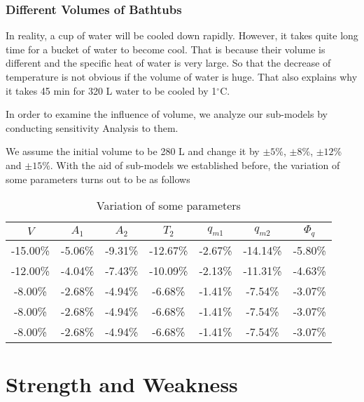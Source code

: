 \documentclass{mcmthesis}
\begin{document}
\subsubsection{Different Volumes of Bathtubs}

In reality, a cup of water will be cooled down rapidly. However, it takes quite
long time for a bucket of water to become cool. That is because their volume is
different and the specific heat of water is very large. So that the decrease of
temperature is not obvious if the volume of water is huge. That also explains
why it takes 45 min for 320 L water to be cooled by 1$^\circ$C.

In order to examine the influence of volume, we analyze our sub-models
by conducting sensitivity Analysis to them.

We assume the initial volume to be 280 L and change it by $\pm 5$\%, $\pm 8$\%,
$\pm 12$\% and $\pm 15$\%. With the aid of sub-models we established before, the
variation of some parameters turns out to be as follows

\begin{table}[h] %
    \centering  %
    \caption{Variation of some parameters}  %
    \label{tab7} %
    \begin{tabular}{ccccccc} %
        \toprule  %
        $V$      & $A_1$   & $A_2$   & $T_2$    & $q_{m1}$ & $q_{m2}$ & $\Phi_q$ \\
        \midrule  %
        -15.00\% & -5.06\% & -9.31\% & -12.67\% & -2.67\%  & -14.14\% & -5.80\%  \\
        -12.00\% & -4.04\% & -7.43\% & -10.09\% & -2.13\%  & -11.31\% & -4.63\%  \\
        -8.00\%  & -2.68\% & -4.94\% & -6.68\%  & -1.41\%  & -7.54\%  & -3.07\%  \\
        -8.00\%  & -2.68\% & -4.94\% & -6.68\%  & -1.41\%  & -7.54\%  & -3.07\%  \\
        -8.00\%  & -2.68\% & -4.94\% & -6.68\%  & -1.41\%  & -7.54\%  & -3.07\%  \\
        \bottomrule  %
    \end{tabular}
\end{table}

\section{Strength and Weakness}
\end{document}
